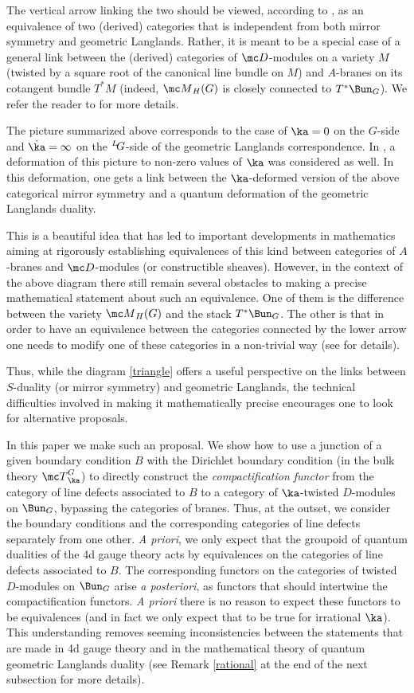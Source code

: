 \documentclass[11pt,reqno]{amsart}
\theoremstyle{plain}
\numberwithin{equation}{section}
\def\neg{\negthinspace}
\def\LG{{}^L\neg G}
\theoremstyle{definition}
\begin{document}
The vertical arrow linking the two should be viewed, according to
\cite{KW}, as an equivalence of two (derived) categories that is
independent from both mirror symmetry and geometric Langlands. Rather,
it is meant to be a special case of a general link between the
(derived) categories of ${\mc D}$-modules on a variety $M$ (twisted by
a square root of the canonical line bundle on $M$) and $A$-branes on
its cotangent bundle $T^*M$ (indeed, ${\mc M}_H(G)$ is closely
connected to $T^* \Bun_G$). We refer the reader to \cite{KW} for more
details.

The picture summarized above corresponds to the case of $\ka=0$ on the
$G$-side and $\check\ka=\infty$ on the $\LG$-side of the geometric
Langlands correspondence. In \cite{KW}, a deformation of this picture
to non-zero values of $\ka$ was considered as well. In this
deformation, one gets a link between the $\ka$-deformed version of the
above categorical mirror symmetry and a quantum deformation of the
geometric Langlands duality.

This is a beautiful idea that has led to important developments in
mathematics aiming at rigorously establishing equivalences of this
kind between categories of $A$-branes and ${\mc D}$-modules (or
constructible sheaves). However, in the context of the above diagram
there still remain several obstacles to making a precise mathematical
statement about such an equivalence. One of them is the difference
between the variety ${\mc M}_H(G)$ and the stack $T^* \Bun_G$. The
other is that in order to have an equivalence between the categories
connected by the lower arrow one needs to modify one of these
categories in a non-trivial way (see \cite{AG,EY2} for details).

Thus, while the diagram \eqref{triangle} offers a useful perspective
on the links between $S$-duality (or mirror symmetry) and geometric
Langlands, the technical difficulties involved in making it
mathematically precise encourages one to look for alternative
proposals.

In this paper we make such an proposal. We show how to use a junction
of a given boundary condition $B$ with the Dirichlet boundary
condition (in the bulk theory ${\mc T}^G_\ka$) to directly construct
the {\em compactification functor} from the category of line defects
associated to $B$ to a category of $\ka$-twisted $D$-modules on
$\Bun_G$, bypassing the categories of branes. Thus, at the outset, we
consider the boundary conditions and the corresponding categories of
line defects separately from one other. {\em A priori}, we only expect
that the groupoid of quantum dualities of the 4d gauge theory acts by
equivalences on the categories of line defects associated to $B$. The
corresponding functors on the categories of twisted $D$-modules on
$\Bun_G$ arise {\em a posteriori}, as functors that should intertwine
the compactification functors. {\em A priori} there is no reason to
expect these functors to be equivalences (and in fact we only expect
that to be true for irrational $\ka$). This understanding removes seeming
inconsistencies between the statements that are made in 4d gauge
theory and in the mathematical theory of quantum geometric Langlands
duality (see Remark \ref{rational} at the end of the next subsection
for more details).
\end{document}
